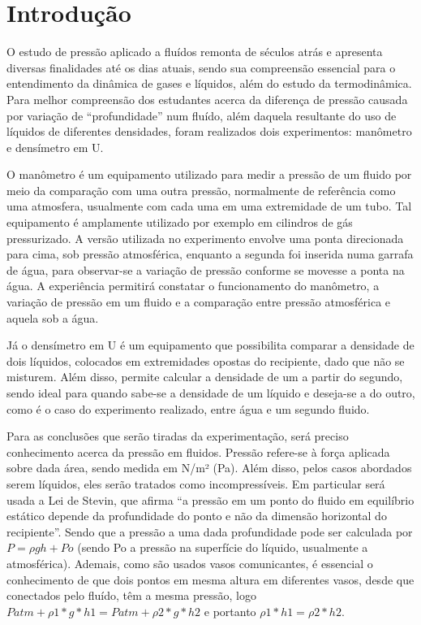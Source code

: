 \section{Introdução}
    O estudo de pressão aplicado a fluídos remonta de séculos atrás e apresenta
    diversas finalidades até os dias atuais, sendo sua compreensão essencial
    para o entendimento da dinâmica de gases e líquidos, além do estudo da
    termodinâmica. Para melhor compreensão dos estudantes acerca da diferença de
    pressão causada por variação de “profundidade” num fluído, além daquela
    resultante do uso de líquidos de diferentes densidades, foram realizados
    dois experimentos: manômetro e densímetro em U.


    O manômetro é um equipamento utilizado para medir a pressão de um fluido por
    meio da comparação com uma outra pressão, normalmente de referência como uma
    atmosfera, usualmente com cada uma em uma extremidade de um tubo. Tal
    equipamento é amplamente utilizado por exemplo em cilindros de gás
    pressurizado. A versão utilizada no experimento envolve uma ponta
    direcionada para cima, sob pressão atmosférica, enquanto a segunda foi
    inserida numa garrafa de água, para observar-se a variação de pressão
    conforme se movesse a ponta na água. A experiência permitirá constatar o
    funcionamento do manômetro, a variação de pressão em um fluido e a
    comparação entre pressão atmosférica e aquela sob a água.


    Já o densímetro em U é um equipamento que possibilita comparar a densidade
    de dois líquidos, colocados em extremidades opostas do recipiente, dado que
    não se misturem. Além disso, permite calcular a densidade de um a partir do
    segundo, sendo ideal para quando sabe-se a densidade de um líquido e
    deseja-se a do outro, como é o caso do experimento realizado, entre água e
    um segundo fluido.


    Para as conclusões que serão tiradas da experimentação, será preciso
    conhecimento acerca da pressão em fluidos. Pressão refere-se à força
    aplicada sobre dada área, sendo medida em N/m² (Pa). Além disso, pelos casos
    abordados serem líquidos, eles serão tratados como incompressíveis. Em
    particular será usada a Lei de Stevin, que afirma “a pressão em um ponto do
    fluido em equilíbrio estático depende da profundidade do ponto e não da
    dimensão horizontal do recipiente”. Sendo que a pressão a uma dada
    profundidade pode ser calculada por \(P = \rho gh + Po \) (sendo Po a
    pressão na superfície do líquido, usualmente a atmosférica). Ademais, como
    são usados vasos comunicantes, é essencial o conhecimento de que dois pontos
    em mesma altura em diferentes vasos, desde que conectados pelo fluído, têm a
    mesma pressão, logo \(Patm + \rho1*g*h1 = Patm + \rho2*g*h2\) e portanto
    \(\rho1*h1 = \rho 2*h2\).

